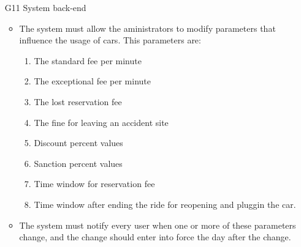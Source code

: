 \begin{itemize}
				\item [G11] System back-end %
					\begin{itemize}
						\item The system must allow the aministrators to modify parameters that influence the usage of cars. This parameters are:
							\begin{enumerate}
								\item The standard fee per minute
								\item The exceptional fee per minute
								\item The lost reservation fee
								\item The fine for leaving an accident site %
								\item Discount percent values
								\item Sanction percent values
								\item Time window for reservation fee
								\item Time window after ending the ride for reopening and pluggin the car.
							\end{enumerate}
						\item The system must notify every user when one or more of these parameters change, and the change should enter into force the day after the change. %
					\end{itemize}
\end{itemize}













